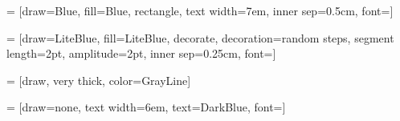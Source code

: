 


 = [draw=Blue, 
                     fill=Blue, 
                     rectangle, 
                     text width=7em, 
                     inner sep=0.5cm, 
                     font=\large]

 = [draw=LiteBlue, 
                       fill=LiteBlue, 
                       decorate,
                       decoration={random steps,
                                   segment length=2pt,
                                   amplitude=2pt},
                       inner sep=0.25cm, 
                       font=\normalsize]
                    
 = [draw,
                        very thick,
                        color=GrayLine]
                        
 = [draw=none, 
                          text width=6em,
                          text=DarkBlue,
                          font=\large]

